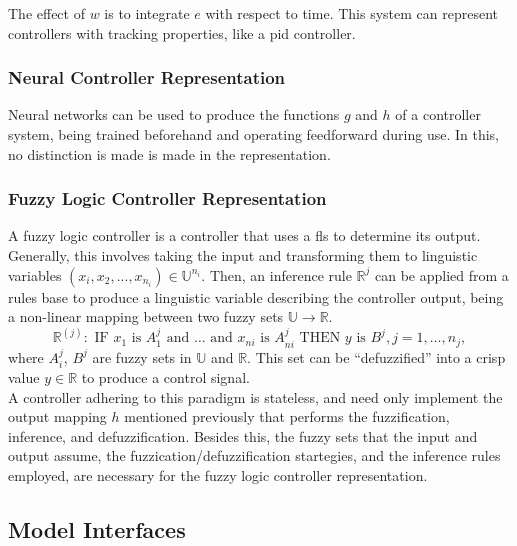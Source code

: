 The effect of $w$ is to integrate $e$ with respect to time. This system can represent controllers with tracking
properties, like a \acrshort{pid} controller.

\subsubsection{Neural Controller Representation}\label{sec:nnc}

Neural networks can be used to produce the functions $g$ and $h$ of a controller system, being trained 
beforehand and operating feedforward during use. In this, no distinction is made is made in the representation. \\

\subsubsection{Fuzzy Logic Controller Representation}\label{sec:flc}

A fuzzy logic controller is a controller that uses a \acrlong{fls} to determine its output. Generally, this involves 
taking the input and transforming them to linguistic variables $(x_i, x_2, ..., x_{n_i}) \in \mathbb U^{n_i}$. Then, 
an inference rule $\mathbb R^j$ can be applied from a rules base to produce a linguistic variable describing 
the controller output, being a non-linear mapping between two fuzzy sets $\mathbb U \rightarrow \mathbb R$. 
\begin{equation}
\mathbb{R}^{(j)}:\text{ IF }x_{1}\text{ is }A_{1}^{j}\text{ and }\ldots\text{ and }x_{n i}\text{ is }A_{n i}^{j}\text{ THEN }y\text{ is }B^{j}, j=1, \ldots, n_{j},
\end{equation}
where $A_i^j$, $B^j$ are fuzzy sets in $\mathbb U$ and $\mathbb R$. This set can be ``defuzzified'' into a crisp value $y \in \mathbb R$ to produce a control signal. \\

A controller adhering to this paradigm is stateless, and need only implement the output mapping $h$
mentioned previously that performs the fuzzification, inference, and defuzzification. Besides this, the fuzzy 
sets that the input and output assume, the fuzzication/defuzzification startegies, and the inference rules employed, are necessary for the fuzzy logic controller representation.

\subsection{Model Interfaces}

